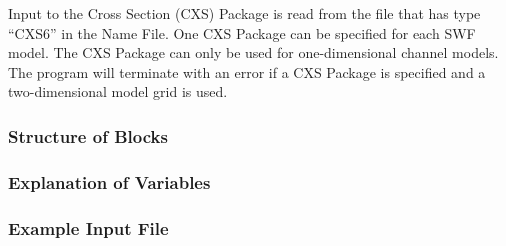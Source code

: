 Input to the Cross Section (CXS) Package is read from the file that has type ``CXS6'' in the Name File.  One CXS Package can be specified for each SWF model. The CXS Package can only be used for one-dimensional channel models.  The program will terminate with an error if a CXS Package is specified and a two-dimensional model grid is used.

\vspace{5mm}
\subsubsection{Structure of Blocks}





\vspace{5mm}
\subsubsection{Explanation of Variables}
\begin{description}

\end{description}

\vspace{5mm}
\subsubsection{Example Input File}


